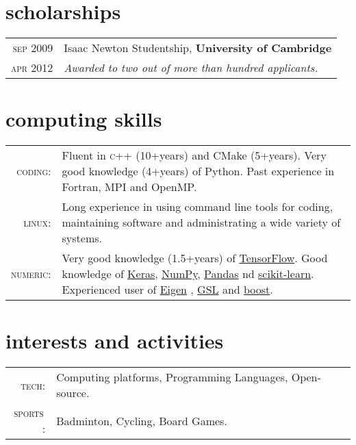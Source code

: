 \documentclass[a4paper,10pt]{article}
\begin{document}
\section{scholarships}
\begin{tabular}{r|p{11cm}}
\textsc{sep 2009} & Isaac Newton Studentship, \textbf{University of Cambridge}\\
\textsc{apr 2012} & \emph{Awarded to two out of more than hundred applicants.}
\end{tabular}


\section{computing skills}
\begin{tabular}{r|p{11cm}}
\textsc{coding}: & Fluent in \textsc{c++} (10+years) and CMake (5+years). Very good knowledge (4+years) of Python.
Past experience in Fortran, MPI and OpenMP. \\
\textsc{linux}:& Long experience in using command line tools for coding, maintaining software and administrating a
wide variety of systems.  \\
\small{\textsc{numeric}}: & Very good knowledge (1.5+years) of \href{https://www.tensorflow.org/}{TensorFlow}.
Good knowledge of \href{https://keras.io/}{Keras}, \href{http://www.numpy.org/}{NumPy},
\href{https://pandas.pydata.org/}{Pandas} nd \href{http://scikit-learn.org/stable/}{scikit-learn}.
Experienced user of \href{http://eigen.tuxfamily.org/index.php?title=Main_Page}{Eigen} , \href{https://www.gnu.org/software/gsl/}{GSL} and \href{http://www.boost.org/}{boost}.
\end{tabular}

\section{interests and activities}
\begin{tabular}{r|p{11cm}}
\textsc{tech}: & Computing platforms, Programming Languages, Open-source.\\
\textsc{sports}$\,$: & Badminton, Cycling, Board Games.
\end{tabular}
\end{document}

